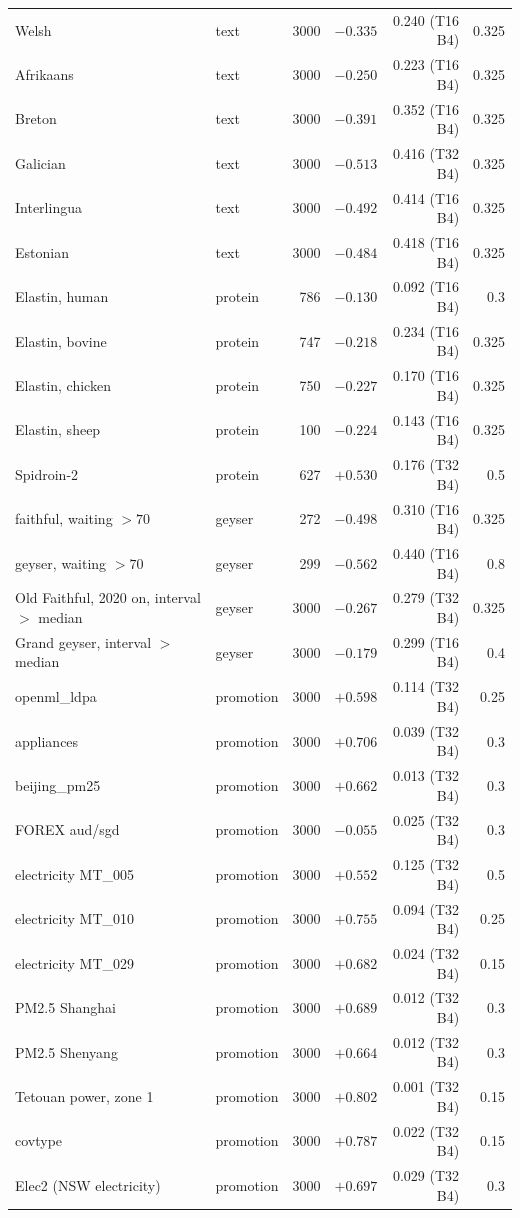\documentclass{article}
\theoremstyle{plain}
\theoremstyle{definition}
\theoremstyle{remark}
\begin{document}
\begin{longtable}{llrrrr}
Welsh & text & 3000 & $-0.335$ & 0.240 (T16 B4) & 0.325\\
Afrikaans & text & 3000 & $-0.250$ & 0.223 (T16 B4) & 0.325\\
Breton & text & 3000 & $-0.391$ & 0.352 (T16 B4) & 0.325\\
Galician & text & 3000 & $-0.513$ & 0.416 (T32 B4) & 0.325\\
Interlingua & text & 3000 & $-0.492$ & 0.414 (T16 B4) & 0.325\\
Estonian & text & 3000 & $-0.484$ & 0.418 (T16 B4) & 0.325\\
\midrule
Elastin, human & protein & 786 & $-0.130$ & 0.092 (T16 B4) & 0.3\\
Elastin, bovine & protein & 747 & $-0.218$ & 0.234 (T16 B4) & 0.325\\
Elastin, chicken & protein & 750 & $-0.227$ & 0.170 (T16 B4) & 0.325\\
Elastin, sheep & protein & 100 & $-0.224$ & 0.143 (T16 B4) & 0.325\\
Spidroin-2 & protein & 627 & $+0.530$ & 0.176 (T32 B4) & 0.5\\
\midrule
faithful, waiting $>70$ & geyser & 272 & $-0.498$ & 0.310 (T16 B4) & 0.325\\
geyser, waiting $>70$ & geyser & 299 & $-0.562$ & 0.440 (T16 B4) & 0.8\\
Old Faithful, 2020 on, interval $>$ median & geyser & 3000 & $-0.267$ & 0.279 (T32 B4) & 0.325\\
Grand geyser, interval $>$ median & geyser & 3000 & $-0.179$ & 0.299 (T16 B4) & 0.4\\
\midrule
openml\_ldpa & promotion & 3000 & $+0.598$ & 0.114 (T32 B4) & 0.25\\
appliances & promotion & 3000 & $+0.706$ & 0.039 (T32 B4) & 0.3\\
beijing\_pm25 & promotion & 3000 & $+0.662$ & 0.013 (T32 B4) & 0.3\\
FOREX aud/sgd & promotion & 3000 & $-0.055$ & 0.025 (T32 B4) & 0.3\\
electricity MT\_005 & promotion & 3000 & $+0.552$ & 0.125 (T32 B4) & 0.5\\
electricity MT\_010 & promotion & 3000 & $+0.755$ & 0.094 (T32 B4) & 0.25\\
electricity MT\_029 & promotion & 3000 & $+0.682$ & 0.024 (T32 B4) & 0.15\\
PM2.5 Shanghai & promotion & 3000 & $+0.689$ & 0.012 (T32 B4) & 0.3\\
PM2.5 Shenyang & promotion & 3000 & $+0.664$ & 0.012 (T32 B4) & 0.3\\
Tetouan power, zone 1 & promotion & 3000 & $+0.802$ & 0.001 (T32 B4) & 0.15\\
covtype & promotion & 3000 & $+0.787$ & 0.022 (T32 B4) & 0.15\\
Elec2 (NSW electricity) & promotion & 3000 & $+0.697$ & 0.029 (T32 B4) & 0.3\\
\bottomrule
\end{longtable}


\end{document}
